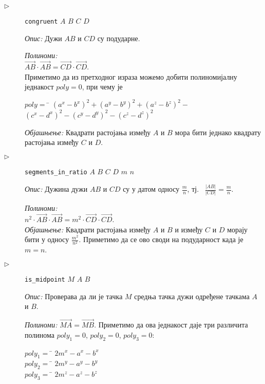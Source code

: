 \begin{description}
\item[$\triangleright$] {\tt congruent} $A$ $B$ $C$ $D$

  {\em Опис:} Дужи $AB$ и $CD$ су подударне.


{\em Полиноми:} \\ $\overrightarrow{AB} \cdot \overrightarrow{AB} =
\overrightarrow{CD} \cdot \overrightarrow{CD}$. \\ Приметимо да из
претходног израза можемо добити полиномијалну једнакост $poly = 0$,
при чему је

\begin{tabbing}
$poly = $ \= $({a^x} - {b^x})^2 + ({a^y} - {b^y})^2 + ({a^z} - {b^z})^2 -$ \\ 
          \> $({c^x} - {d^x})^2 - ({c^y} - {d^y})^2 - ({c^z} - {d^z})^2$
\end{tabbing}

{\em Објашњење:} Квадрати растојања између $A$ и $B$ мора бити једнако
квадрату растојања између $C$ и $D$.

\item[$\triangleright$] {\tt segments\_in\_ratio} $A$ $B$ $C$ $D$
  $m$ $n$ 

  {\em Опис:} Дужина дужи $AB$ и $CD$ су у датом односу $\frac{m}{n}$,
  тј.~ $\frac{|AB|}{|CD|} = \frac{m}{n}$.

{\em Полиноми:} \\
$n^2 \cdot \overrightarrow{AB} \cdot \overrightarrow{AB} = m^2 \cdot \overrightarrow{CD} \cdot \overrightarrow{CD}$. \\


{\em Објашњење:} Квадрати растојања између $A$ и $B$ и између $C$ и
$D$ морају бити у односу $\frac{m^2}{n^2}$. Приметимо да се ово своди
на подударност када је $m = n$.

\item[$\triangleright$] {\tt is\_midpoint} $M$ $A$ $B$

{\em Опис:} Проверава да ли је тачка $M$ средња тачка дужи одређене
тачкама $A$ и $B$.

{\em Полиноми:} $\overrightarrow{MA} = \overrightarrow{MB}$.
Приметимо да ова једнакост даје три различита полинома $poly_1 = 0$,
$poly_2 = 0$, $poly_3 = 0$:

\begin{tabbing}
$poly_1 = $ \= $2m^x - a^x - b^x$ \\ 
$poly_2 = $ \= $2m^y - a^y - b^y$ \\ 
$poly_3 = $ \= $2m^z - a^z - b^z$
\end{tabbing}


\end{description}
